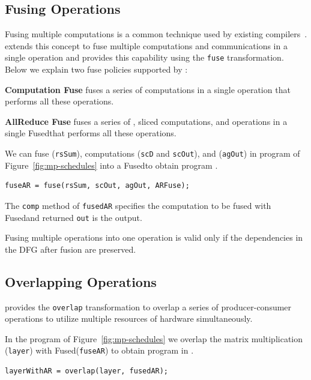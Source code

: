 \subsection{Fusing Operations}
\label{sec:sched:fusion}

Fusing multiple computations is a common technique used by existing compilers~\cite{tvm18,distributed-halide,fireiron,polymage-gpu,halide}.
\tool extends this concept to fuse multiple computations and communications in a single operation and provides this capability using the \texttt{fuse} transformation.
Below we explain two fuse policies supported by \tool:

\textbf{Computation Fuse} fuses a series of computations in a single operation that performs all these operations.

\textbf{AllReduce Fuse} fuses a series of \reducescatter, sliced computations, and \allgather operations in a single Fused\allreduce that performs all these operations.

We can fuse \reducescatter (\texttt{rsSum}), computations (\texttt{scD} and \texttt{scOut}), and \allgather (\texttt{agOut}) in program  of Figure~\ref{fig:mp-schedules} into a Fused\allreduce to obtain program .
{
\small
\begin{lstlisting}[language=DSL,numbers=none]
fuseAR = fuse(rsSum, scOut, agOut, ARFuse);
\end{lstlisting}
}
The \texttt{comp} method of \texttt{fusedAR} specifies the computation to be fused with Fused\allreduce and returned \texttt{out} is the output.

 Fusing multiple operations into one operation is valid only if the dependencies in the DFG after fusion are preserved.

\subsection{Overlapping Operations}
\tool provides the \texttt{overlap} transformation to overlap a series of producer-consumer operations to utilize multiple resources of hardware simultaneously.

In the program  of Figure~\ref{fig:mp-schedules} we overlap the matrix multiplication (\texttt{layer}) with Fused\allreduce (\texttt{fuseAR}) to obtain program in .
{
\small
\begin{lstlisting}[language=DSL,numbers=none]
layerWithAR = overlap(layer, fusedAR);
\end{lstlisting}
}

